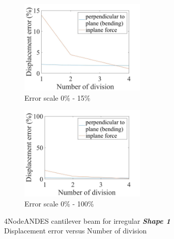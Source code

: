 \documentclass[fleqn,11pt,letter]{article}
\begin{document}
\begin{figure}[H]
  \begin{subfigure}{0.5\textwidth}
    \centering
    \includegraphics[width=6cm]{../Figure_files/4NodeANDES/error4andes_beam_irregular_shape1.jpeg}
    \caption{Error scale 0\% - 15\%}
  \end{subfigure}
  \begin{subfigure}{0.5\textwidth}
    \centering
    \includegraphics[width=6cm]{../Figure_files/4NodeANDES/error4andes_beam_irregular_shape1100.jpeg}
    \caption{Error scale 0\% - 100\%}
  \end{subfigure}
  \captionsetup{justification=centering,margin=2cm}
  \caption{4NodeANDES cantilever beam for irregular \emph{\textbf{Shape 1}}\\
      Displacement error   versus   Number of division}
  \label{fig shape 1 4NodeANDES cantilever beam for irregular more elements}
\end{figure}


\end{document}
